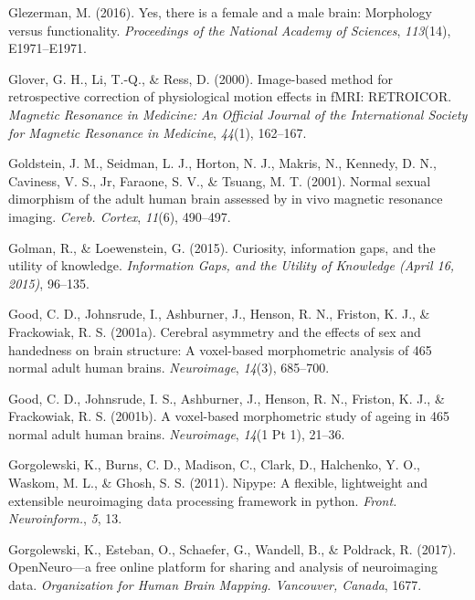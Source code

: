 \documentclass[12pt,american,a4paper,oneside,]{memoir} %
\begin{document}
\leavevmode\hypertarget{ref-Glezerman2016-xl}{}%
Glezerman, M. (2016). Yes, there is a female and a male brain: Morphology versus functionality. \emph{Proceedings of the National Academy of Sciences}, \emph{113}(14), E1971--E1971.

\leavevmode\hypertarget{ref-Glover2000-or}{}%
Glover, G. H., Li, T.-Q., \& Ress, D. (2000). Image-based method for retrospective correction of physiological motion effects in fMRI: RETROICOR. \emph{Magnetic Resonance in Medicine: An Official Journal of the International Society for Magnetic Resonance in Medicine}, \emph{44}(1), 162--167.

\leavevmode\hypertarget{ref-Goldstein2001-dy}{}%
Goldstein, J. M., Seidman, L. J., Horton, N. J., Makris, N., Kennedy, D. N., Caviness, V. S., Jr, Faraone, S. V., \& Tsuang, M. T. (2001). Normal sexual dimorphism of the adult human brain assessed by in vivo magnetic resonance imaging. \emph{Cereb. Cortex}, \emph{11}(6), 490--497.

\leavevmode\hypertarget{ref-golman2015curiosity}{}%
Golman, R., \& Loewenstein, G. (2015). Curiosity, information gaps, and the utility of knowledge. \emph{Information Gaps, and the Utility of Knowledge (April 16, 2015)}, 96--135.

\leavevmode\hypertarget{ref-Good2001-ak}{}%
Good, C. D., Johnsrude, I., Ashburner, J., Henson, R. N., Friston, K. J., \& Frackowiak, R. S. (2001a). Cerebral asymmetry and the effects of sex and handedness on brain structure: A voxel-based morphometric analysis of 465 normal adult human brains. \emph{Neuroimage}, \emph{14}(3), 685--700.

\leavevmode\hypertarget{ref-Good2001-kv}{}%
Good, C. D., Johnsrude, I. S., Ashburner, J., Henson, R. N., Friston, K. J., \& Frackowiak, R. S. (2001b). A voxel-based morphometric study of ageing in 465 normal adult human brains. \emph{Neuroimage}, \emph{14}(1 Pt 1), 21--36.

\leavevmode\hypertarget{ref-Gorgolewski2011-aa}{}%
Gorgolewski, K., Burns, C. D., Madison, C., Clark, D., Halchenko, Y. O., Waskom, M. L., \& Ghosh, S. S. (2011). Nipype: A flexible, lightweight and extensible neuroimaging data processing framework in python. \emph{Front. Neuroinform.}, \emph{5}, 13.

\leavevmode\hypertarget{ref-Gorgolewski2017-uu}{}%
Gorgolewski, K., Esteban, O., Schaefer, G., Wandell, B., \& Poldrack, R. (2017). OpenNeuro---a free online platform for sharing and analysis of neuroimaging data. \emph{Organization for Human Brain Mapping. Vancouver, Canada}, 1677.
\end{document}
